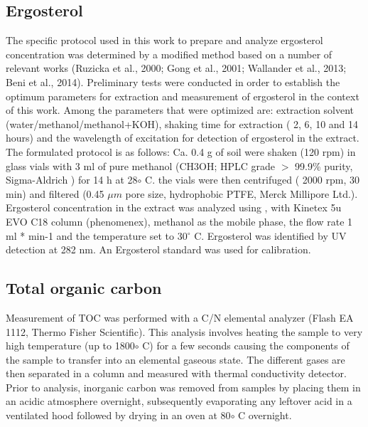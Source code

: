     \subsection{Ergosterol}
    	The specific protocol used in this work to prepare and analyze ergosterol concentration was determined by a modified method based on a number of relevant works (Ruzicka et al., 2000; Gong et al., 2001; Wallander et al., 2013; Beni et al., 2014). Preliminary tests were conducted in order to establish the optimum parameters for extraction and measurement of ergosterol in the context of this work. Among the parameters that were optimized are: extraction solvent (water/methanol/methanol+KOH), shaking time for extraction ( 2, 6, 10 and 14 hours) and the wavelength of excitation for detection of ergosterol in the extract. The formulated protocol is as follows: Ca. 0.4 g of soil were shaken (120 rpm) in glass vials with 3 ml of pure methanol (CH3OH; HPLC grade $ > $ 99.9\% purity, Sigma-Aldrich ) for 14 h at 28$ \circ $ C. the vials were then centrifuged ( 2000 rpm, 30 min) and filtered (0.45 $ \mu m $ pore size, hydrophobic PTFE, Merck Millipore Ltd.). Ergosterol concentration in the extract was analyzed using  , with Kinetex 5u EVO C18 column (phenomenex), methanol as the mobile phase, the flow rate 1 ml * min-1 and the temperature set to 30$ ^\circ $  C. Ergosterol was identified by UV detection at 282 nm. An Ergosterol standard was used for calibration.


    \subsection{Total organic carbon}

    	Measurement of TOC was performed with a C/N elemental analyzer (Flash EA 1112, Thermo Fisher Scientific). This analysis involves heating the sample to very high temperature (up to 1800$\circ$ C) for a few seconds causing the components of the sample to transfer into an elemental gaseous state. The different gases are then separated in a column and measured with thermal conductivity detector. Prior to analysis, inorganic carbon was removed from samples by placing them in an acidic atmosphere overnight, subsequently evaporating any leftover acid in a ventilated hood followed by drying in an oven at 80$\circ$ C overnight.


